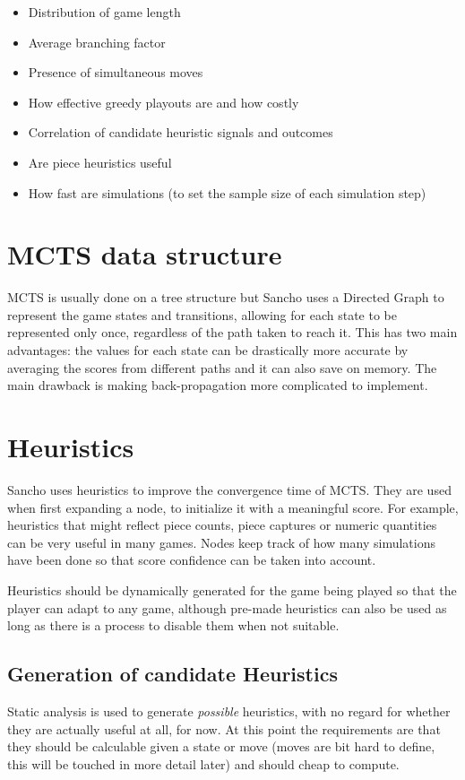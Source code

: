 \begin{itemize}
	\item Distribution of game length
	\item Average branching factor
	\item Presence of simultaneous moves
	\item How effective greedy playouts are and how costly
	\item Correlation of candidate heuristic signals and outcomes
	\item Are piece heuristics useful
	\item How fast are simulations (to set the sample size of each simulation step)
\end{itemize}

\newpage

\section{MCTS data structure}
MCTS is usually done on a tree structure but Sancho uses a Directed Graph to represent the game states and transitions, allowing for each state to be represented only once, regardless of the path taken to reach it.
This has two main advantages: the values for each state can be drastically more accurate by averaging the scores from different paths and it can also save on memory.
The main drawback is making back-propagation more complicated to implement.


\section{Heuristics}
Sancho uses heuristics to improve the convergence time of MCTS. They are used when first expanding a node, to initialize it with a meaningful score. For example, heuristics that might reflect piece counts, piece captures or numeric quantities can be very useful in many games. Nodes keep track of how many simulations have been done so that score confidence can be taken into account. 

Heuristics should be dynamically generated for the game being played so that the player can adapt to any game, although pre-made heuristics can also be used as long as there is a process to disable them when not suitable.


\subsection{Generation of candidate Heuristics}
Static analysis is used to generate \textit{possible} heuristics, with no regard for whether they are actually useful at all, for now. At this point the requirements are that they should be calculable given a state or move (moves are bit hard to define, this will be touched in more detail later) and should cheap to compute.


